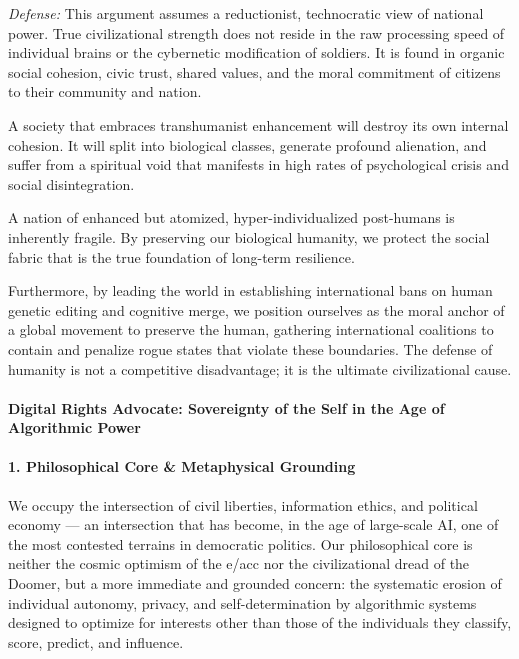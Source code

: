 \emph{Defense:} This argument assumes a reductionist, technocratic view
of national power. True civilizational strength does not reside in the
raw processing speed of individual brains or the cybernetic modification
of soldiers. It is found in organic social cohesion, civic trust, shared
values, and the moral commitment of citizens to their community and
nation.

A society that embraces transhumanist enhancement will destroy its own
internal cohesion. It will split into biological classes, generate
profound alienation, and suffer from a spiritual void that manifests in
high rates of psychological crisis and social disintegration.

A nation of enhanced but atomized, hyper-individualized post-humans is
inherently fragile. By preserving our biological humanity, we protect
the social fabric that is the true foundation of long-term resilience.

Furthermore, by leading the world in establishing international bans on
human genetic editing and cognitive merge, we position ourselves as the
moral anchor of a global movement to preserve the human, gathering
international coalitions to contain and penalize rogue states that
violate these boundaries. The defense of humanity is not a competitive
disadvantage; it is the ultimate civilizational cause.

\paragraph{Digital Rights Advocate: Sovereignty of the Self in the Age
of Algorithmic
Power}\label{digital-rights-advocate-sovereignty-of-the-self-in-the-age-of-algorithmic-power}

\paragraph{1. Philosophical Core \& Metaphysical
Grounding}\label{philosophical-core-metaphysical-grounding-34}

We occupy the intersection of civil liberties, information ethics, and
political economy --- an intersection that has become, in the age of
large-scale AI, one of the most contested terrains in democratic
politics. Our philosophical core is neither the cosmic optimism of the
e/acc nor the civilizational dread of the Doomer, but a more immediate
and grounded concern: the systematic erosion of individual autonomy,
privacy, and self-determination by algorithmic systems designed to
optimize for interests other than those of the individuals they
classify, score, predict, and influence.

